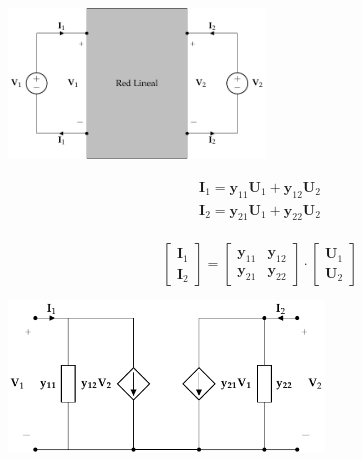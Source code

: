 \documentclass[10pt]{article}
\begin{document}
\begin{minipage}{0.5\textwidth}
  \begin{center}
    \includegraphics[height=4cm]{../figs/cuadripolo_fuentes_tension.pdf}
  \end{center}
\end{minipage}
\begin{minipage}{0.5\textwidth}
  \[
    \begin{array}{l}
      \mathbf{I}_1 = \mathbf{y}_{11} \mathbf{U}_1 + \mathbf{y}_{12} \mathbf{U}_2\\
      \mathbf{I}_2 = \mathbf{y}_{21} \mathbf{U}_1 + \mathbf{y}_{22} \mathbf{U}_2\\
    \end{array}
  \]

  \[
    \left[
      \begin{array}{c}
        \mathbf{I}_1\\
        \mathbf{I}_2
      \end{array}
    \right] =
    \left[
      \begin{array}{cc}
        \mathbf{y}_{11} & \mathbf{y}_{12}\\
        \mathbf{y}_{21} & \mathbf{y}_{22}
      \end{array}
    \right] \cdot
    \left[
      \begin{array}{c}
        \mathbf{U}_1\\
        \mathbf{U}_2
      \end{array}
    \right]
  \]
\end{minipage}

\begin{center}
\includegraphics[height=4cm]{../figs/circuitoEquivalenteY.pdf}
\end{center}
\end{document}

